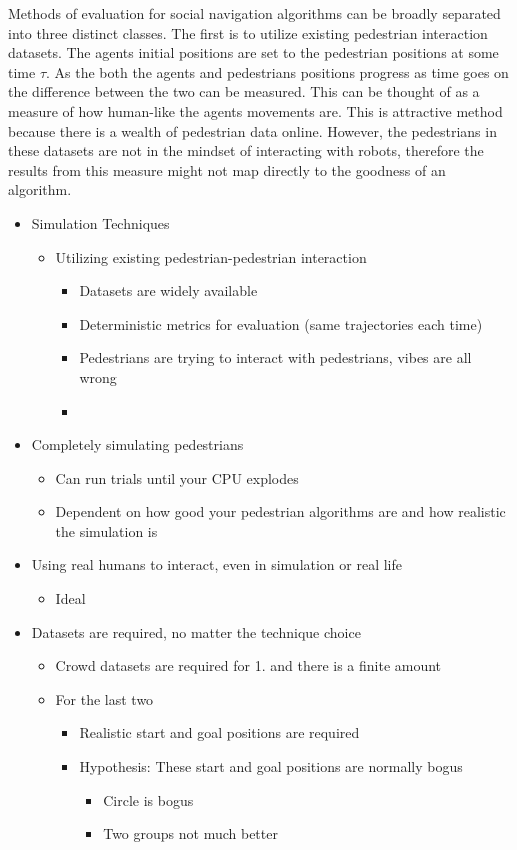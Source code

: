 \documentclass[conference,letter,10pt,final]{IEEEtran}
\begin{document}
Methods of evaluation for social navigation algorithms can be broadly separated
into three distinct classes. The first is to utilize existing pedestrian
interaction datasets. The agents initial positions are set to the pedestrian
positions at some time \(\tau\). As the both the agents and pedestrians positions
progress as time goes on the difference between the two can be measured. This
can be thought of as a measure of how human-like the agents movements are. This
is attractive method because there is a wealth of pedestrian data online.
However, the pedestrians in these datasets are not in the mindset of interacting
with robots, therefore the results from this measure might not map directly to
the goodness of an algorithm.

\begin{itemize}
\item Simulation Techniques
\begin{itemize}
\item Utilizing existing pedestrian-pedestrian interaction
\begin{itemize}
\item Datasets are widely available
\item Deterministic metrics for evaluation (same trajectories each time)
\item Pedestrians are trying to interact with pedestrians, vibes are all wrong
\item \cite{yao19following}
\end{itemize}
\end{itemize}
\item Completely simulating pedestrians
\begin{itemize}
\item Can run trials until your CPU explodes
\item Dependent on how good your pedestrian algorithms are and how realistic the simulation is
\end{itemize}
\item Using real humans to interact, even in simulation or real life
\begin{itemize}
\item Ideal
\end{itemize}

\item Datasets are required, no matter the technique choice
\begin{itemize}
\item Crowd datasets are required for 1. and there is a finite amount
\item For the last two
\begin{itemize}
\item Realistic start and goal positions are required
\item Hypothesis: These start and goal positions are normally bogus
\begin{itemize}
\item Circle is bogus
\item Two groups not much better
\end{itemize}
\end{itemize}
\end{itemize}
\end{itemize}
\end{document}

